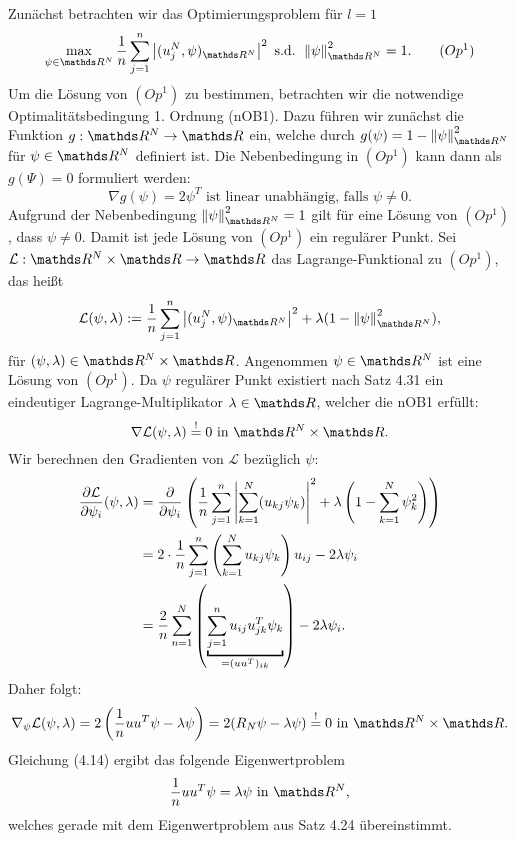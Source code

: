 \\
Zunächst betrachten wir das Optimierungsproblem für $l=1$
\begin{align*}
\max\limits_{\psi\in \R^N} \frac{1}{n} \sum_{j=1}^n \abs{(u_j^N,\psi)_{\R^N}}^2 \text{ s.d. } \norm{\psi}^2_{\R^N} = 1. \tag*{$(Op^1)$}
\end{align*}
Um die Lösung von $(Op^1)$ zu bestimmen, betrachten wir die notwendige Optimalitätsbedingung 1. Ordnung (nOB1).
Dazu führen wir zunächst die Funktion $g:\R^N \to \R$ ein, welche durch $g(\psi) = 1- \norm{\psi}^2_{\R^N}$ für $\psi\in \R^N$ definiert ist.
Die Nebenbedingung in $(Op^1)$ kann dann als $g(\Psi)=0$ formuliert werden:
\[
\nabla g(\psi) = 2 \psi^T \text{ ist linear unabhängig, falls } \psi \neq 0.
\]
Aufgrund der Nebenbedingung $\norm{\psi}_{\R^N}^2=1$ gilt für eine Lösung von $(Op^1)$, dass $\psi\neq 0$.
Damit ist jede Lösung von $(Op^1)$ ein regulärer Punkt.
Sei $\mathcal{L}:\R^N\times \R \to \R$ das Lagrange-Funktional zu $(Op^1)$, das heißt
\[
\mathcal{L}(\psi,\lambda) := \frac{1}{n} \sum_{j=1}^n \abs{(u_j^N,\psi)_{\R^N}}^2 + \lambda (1-\norm{\psi}_{\R^N}^2),
\]
für $(\psi,\lambda)\in\R^N\times\R$.
Angenommen $\psi\in\R^N$ ist eine Lösung von $(Op^1)$.
Da $\psi$ regulärer Punkt existiert nach Satz 4.31 ein eindeutiger Lagrange-Multiplikator $\lambda\in\R$, welcher die nOB1 erfüllt:
\[
\nabla \mathcal{L}(\psi,\lambda) \bgl{!} 0 \text{ in } \R^N\times \R.
\]
Wir berechnen den Gradienten von $\mathcal{L}$ bezüglich $\psi$:
\begin{align*}
\diff{\mathcal{L}}{\psi_i} (\psi,\lambda) &= \diff{}{\psi_i} \enbrace{ \frac{1}{n} \sum_{j=1}^n \abs{\sum_{k=1}^N (u_{kj}\psi_k)}^2 + \lambda \enbrace{1- \sum_{k=1}^N \psi_k^2 } }\\
&= 2 \cdot \frac{1}{n} \sum_{j=1}^n \enbrace{\sum_{k=1}^N u_{kj}\psi_k}u_{ij} - 2\lambda\psi_i\\
&= \frac{2}{n} \sum_{n=1}^N \enbrace{ \underbracket{\sum_{j=1}^n u_{ij}u_{jk}^T\psi_k}_{=(uu^T)_{ik}}} - 2 \lambda\psi_i.
\end{align*}
Daher folgt:
\begin{align}
\nabla_\psi \mathcal{L}(\psi,\lambda) = 2 \enbrace{\frac{1}{n} uu^T\psi - \lambda \psi} = 2 (R_N\psi-\lambda\psi) \bgl{!} 0 \text{ in } \R^N\times \R.
\end{align}
Gleichung (4.14) ergibt das folgende Eigenwertproblem
\begin{align}
\frac{1}{n} uu^T\psi = \lambda \psi \text{ in } \R^N, 
\end{align}
welches gerade mit dem Eigenwertproblem aus Satz 4.24 übereinstimmt.
